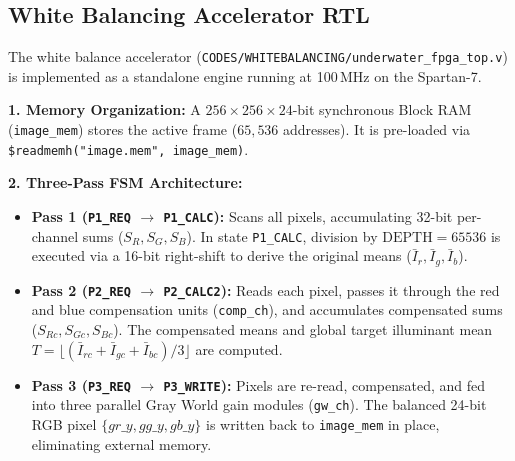 \documentclass[10pt,twocolumn,letterpaper]{article}
\begin{document}
\subsection{White Balancing Accelerator RTL}
\label{sec:wb_rtl}

The white balance accelerator (\texttt{CODES/WHITEBALANCING/\-underwater\_fpga\_top.v}) is implemented as a standalone engine running at 100\,MHz on the Spartan-7.

\textbf{1. Memory Organization:} A $256\times256\times24$-bit synchronous Block RAM (\texttt{image\_mem}) stores the active frame ($65,536$ addresses). It is pre-loaded via \texttt{\$readmemh("image.mem", image\_mem)}.

\textbf{2. Three-Pass FSM Architecture:}
\begin{itemize}
    \item \textbf{Pass 1 (\texttt{P1\_REQ} $\rightarrow$ \texttt{P1\_CALC}):} Scans all pixels, accumulating 32-bit per-channel sums ($S_R, S_G, S_B$). In state \texttt{P1\_CALC}, division by $\text{DEPTH}=65536$ is executed via a 16-bit right-shift to derive the original means ($\bar{I}_r, \bar{I}_g, \bar{I}_b$).
    \item \textbf{Pass 2 (\texttt{P2\_REQ} $\rightarrow$ \texttt{P2\_CALC2}):} Reads each pixel, passes it through the red and blue compensation units (\texttt{comp\_ch}), and accumulates compensated sums ($S_{Rc}, S_{Gc}, S_{Bc}$). The compensated means and global target illuminant mean $T = \lfloor(\bar{I}_{rc} + \bar{I}_{gc} + \bar{I}_{bc})/3\rfloor$ are computed.
    \item \textbf{Pass 3 (\texttt{P3\_REQ} $\rightarrow$ \texttt{P3\_WRITE}):} Pixels are re-read, compensated, and fed into three parallel Gray World gain modules (\texttt{gw\_ch}). The balanced 24-bit RGB pixel $\{gr\_y, gg\_y, gb\_y\}$ is written back to \texttt{image\_mem} in place, eliminating external memory.
\end{itemize}
\end{document}
